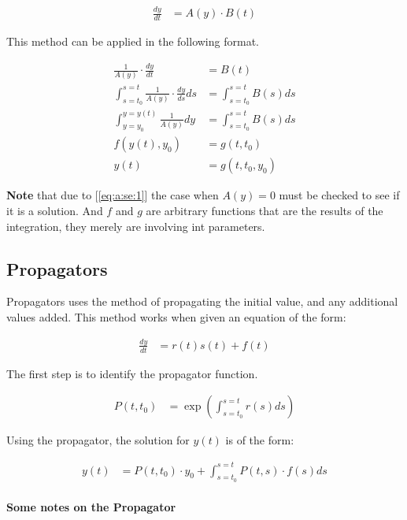 \documentclass{article}
\begin{document}
\begin{align}
  \frac{dy}{dt} &= A(y) \cdot B(t)
\end{align}

This method can be applied in the following format.

\begin{align}
  \frac{1}{A(y)}\cdot\frac{dy}{dt} &= B(t)\label{eq:a:se:1}\\
  \int^{s=t}_{s=t_0} \frac{1}{A(y)} \cdot \frac{dy}{ds}ds &=
  \int^{s=t}_{s=t_0}B(s)ds\\
  \int^{y=y(t)}_{y=y_0} \frac{1}{A(y)} dy &= \int^{s=t}_{s=t_0} B(s)ds\\
  f\left(y(t), y_0\right) &= g\left(t, t_0\right)\\
  y(t) &= g\left(t, t_0, y_0\right)
\end{align}

\textbf{Note} that due to [\ref{eq:a:se:1}] the case when $A(y) = 0$ must be
checked to see if it is a solution. And $f$ and $g$ are arbitrary functions
that are the results of the integration, they merely are involving int
parameters.

\subsection{Propagators}\label{sub:propagators}

Propagators uses the method of propagating the initial value, and any
additional values added. This method works when given an equation of the form:

\begin{align}
  \frac{dy}{dt} &= r(t)s(t) + f(t)
\end{align}

The first step is to identify the propagator function.

\begin{align}
  P(t, t_0) &= \exp\left(\int^{s=t}_{s=t_0}r(s)ds\right)
\end{align}

Using the propagator, the solution for $y(t)$ is of the form:

\begin{align}
  y(t) &= P(t,t_0) \cdot y_0 + \int^{s=t}_{s=t_0} P(t, s) \cdot f(s) ds
\end{align}

\paragraph{Some notes on the Propagator}\label{par:some_notes_on_the_propagator}
\end{document}
